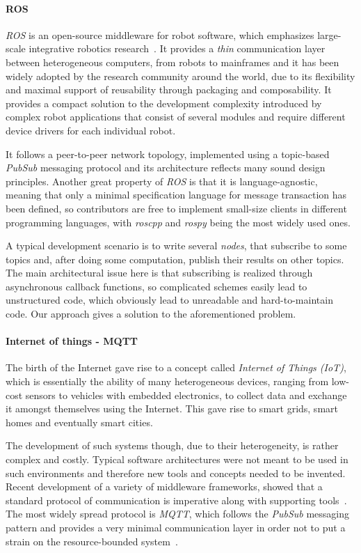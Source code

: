 \documentclass[sigplan,review,anonymous,screen]{acmart}
\begin{document}
\paragraph{ROS}
\textit{ROS} is an open-source middleware for robot software, which emphasizes
large-scale integrative robotics research~\cite{ROS}. It provides a \textit{thin}
communication layer between heterogeneous computers, from robots to mainframes
and it has been widely adopted by the research community around the world, due
to its flexibility and maximal support of reusability through packaging and
composability. It provides a compact solution to the development complexity
introduced by complex robot applications that consist of several modules and
require different device drivers for each individual robot.

It follows a peer-to-peer network topology, implemented using a topic-based
\textit{PubSub} messaging protocol and its architecture reflects many sound
design principles. Another great property of \textit{ROS} is that it is
language-agnostic, meaning that only a minimal specification language for
message transaction has been defined, so contributors are free to implement
small-size clients in different programming languages, with \textit{roscpp} and
\textit{rospy} being the most widely used ones.

A typical development scenario is to write several \textit{nodes}, that
subscribe to some topics and, after doing some computation, publish their
results on other topics. The main architectural issue here is that subscribing
is realized through asynchronous callback functions, so complicated schemes
easily lead to unstructured code, which obviously lead to unreadable and
hard-to-maintain code. Our approach gives a solution to the aforementioned
problem.

\paragraph{Internet of things - MQTT}
The birth of the Internet gave rise to a concept called \textit{Internet of
Things (IoT)}, which is essentially the ability of many heterogeneous devices,
ranging from low-cost sensors to vehicles with embedded electronics, to collect
data and exchange it amongst themselves using the Internet. This gave rise to
smart grids, smart homes and eventually smart cities.

The development of such systems though, due to their heterogeneity, is rather
complex and costly. Typical software architectures were not meant to be used in
such environments and therefore new tools and concepts needed to be invented.
Recent development of a variety of middleware frameworks, showed that a standard
protocol of communication is imperative along with supporting
tools~\cite{iot_middleware}. The most widely spread protocol is \textit{MQTT},
which follows the \textit{PubSub} messaging pattern and provides a very minimal
communication layer in order not to put a strain on the resource-bounded
system~\cite{mqtt}.
\end{document}
